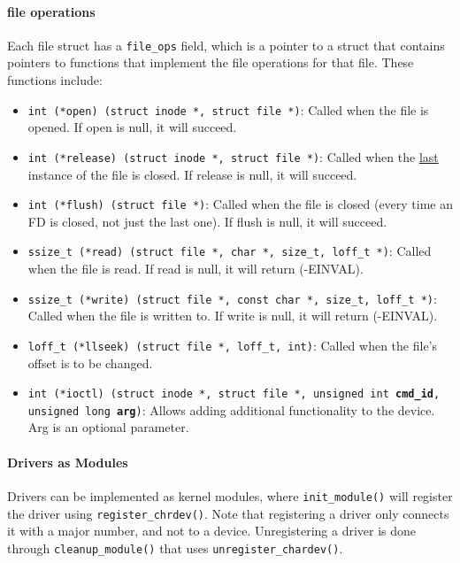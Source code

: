 \documentclass[openany,12pt]{book}
\newcommand{\code}[1]{\texttt{#1}}
\begin{document}
\paragraph{file operations} Each file struct has a \texttt{file\_ops} field, which is a pointer to a struct that contains pointers to functions that implement the file operations for that file. These functions include:
\begin{itemize}
  \item \code{int (*open) (struct inode *, struct file *)}: Called when the file is opened. If open is null, it will succeed.  

  \item \code{int (*release) (struct inode *, struct file *)}: Called when the \ul{last} instance of the file is closed. If release is null, it will succeed.

  \item \code{int (*flush) (struct file *)}: Called when the file is closed (every time an FD is closed, not just the last one). If flush is null, it will succeed.

  \item \code{ssize\_t (*read) (struct file *, char *, size\_t, loff\_t *)}: Called when the file is read. If read is null, it will return (-EINVAL).
  
  \item \code{ssize\_t (*write) (struct file *, const char *, size\_t, loff\_t *)}: Called when the file is written to. If write is null, it will return (-EINVAL).
  
  \item \code{loff\_t (*llseek) (struct file *, loff\_t, int)}: Called when the file's offset is to be changed.
  
  \item \code{int (*ioctl) (struct inode *, struct file *, unsigned int \textbf{cmd\_id}, unsigned long \textbf{arg})}: Allows adding additional functionality to the device. Arg is an optional parameter.
\end{itemize}





\paragraph{Drivers as Modules} Drivers can be implemented as kernel modules, where \code{init\_module()} will register the driver using \code{register\_chrdev()}. Note that registering a driver only connects it with a major number, and not to a device. Unregistering a driver is done through \code{cleanup\_module()} that uses \code{unregister\_chardev()}.
\end{document}
